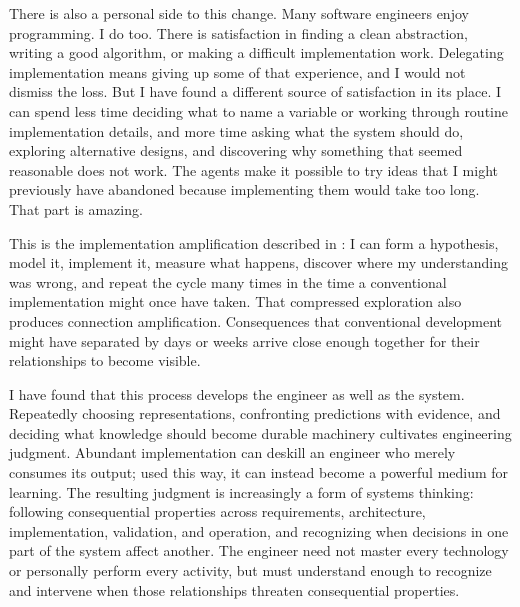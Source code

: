 
There is also a personal side to this change. Many software engineers enjoy programming. I do too. There is satisfaction in finding a clean abstraction, writing a good algorithm, or making a difficult implementation work. Delegating implementation means giving up some of that experience, and I would not dismiss the loss. But I have found a different source of satisfaction in its place. I can spend less time deciding what to name a variable or working through routine implementation details, and more time asking what the system should do, exploring alternative designs, and discovering why something that seemed reasonable does not work. The agents make it possible to try ideas that I might previously have abandoned because implementing them would take too long. That part is amazing.

This is the implementation amplification described in : I can form a hypothesis, model it, implement it, measure what happens, discover where my understanding was wrong, and repeat the cycle many times in the time a conventional implementation might once have taken. That compressed exploration also produces connection amplification. Consequences that conventional development might have separated by days or weeks arrive close enough together for their relationships to become visible.

I have found that this process develops the engineer as well as the system. Repeatedly choosing representations, confronting predictions with evidence, and deciding what knowledge should become durable machinery cultivates engineering judgment. Abundant implementation can deskill an engineer who merely consumes its output; used this way, it can instead become a powerful medium for learning. The resulting judgment is increasingly a form of systems thinking: following consequential properties across requirements, architecture, implementation, validation, and operation, and recognizing when decisions in one part of the system affect another. The engineer need not master every technology or personally perform every activity, but must understand enough to recognize and intervene when those relationships threaten consequential properties.

